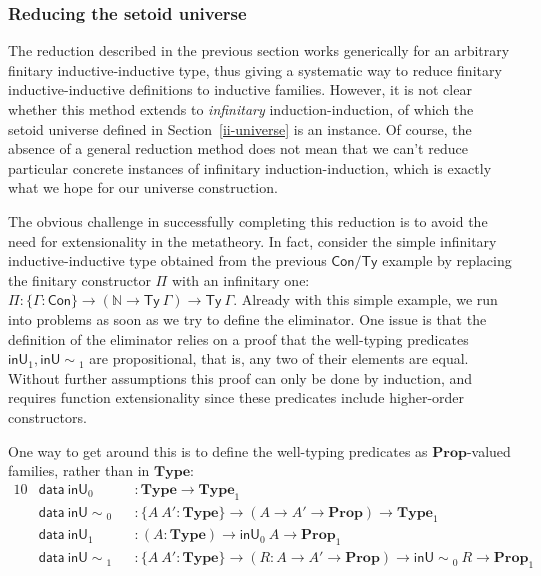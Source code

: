 \documentclass[autoref]{llncs}
\newcommand{\GG}{\Gamma}
\newcommand{\inU}{\mathsf{inU}}
\newcommand{\inUU}{\mathsf{inU{\sim}}}
\newcommand{\mType}{\mathbf{Type}}
\newcommand{\mProp}{\mathbf{Prop}}
\begin{document}
\subsubsection{Reducing the setoid universe}\label{inductive-universe}

The reduction described in the previous section works generically for an
arbitrary finitary inductive-inductive type, thus giving a systematic way to
reduce finitary inductive-inductive definitions to inductive families. However,
it is not clear whether this method extends to \emph{infinitary}
induction-induction, of which the setoid universe defined in
Section~\ref{ii-universe} is an instance.
%
Of course, the absence of a general reduction method does not mean that we can't
reduce particular concrete instances of infinitary induction-induction, which is
exactly what we hope for our universe construction.

The obvious challenge in successfully completing this reduction is to avoid the
need for extensionality in the metatheory. In fact, consider the simple
infinitary inductive-inductive type obtained from the previous $\textsf{Con/Ty}$
example by replacing the finitary constructor $\Pi$ with an infinitary one: $\Pi
: \{\GG : \textsf{Con}\} \to (\mathds{N} \to \textsf{Ty}\ \GG) \to
\textsf{Ty}\ \GG$. Already with this simple example, we run into problems as
soon as we try to define the eliminator. One issue is that the definition of the
eliminator relies on a proof that the well-typing predicates $\inU_1,
\inUU_1$ are propositional, that is, any two of their elements are equal.
%
Without further assumptions this proof can only be done by induction, and
requires function extensionality since these predicates include higher-order
constructors.

One way to get around this is to define the well-typing predicates as
$\mProp$-valued families, rather than in $\mType$:
\vspace{-0.2em}
\begin{alignat*}{10}
  & \textsf{data}\ \inU_0 && : \mType \to \mType_1 \\
  & \textsf{data}\ \inUU_0 && : \{A\ A' : \mType\} \to (A \to A' \to \mProp) \to \mType_1 \\
  & \textsf{data}\ \inU_1 && : (A : \mType) \to \inU_0\ A \to \mProp_1 \\
  & \textsf{data}\ \inUU_1 && : \{A\ A' : \mType\} \to (R : A \to A' \to \mProp) \to \inUU_0\ R \to \mProp_1
\end{alignat*}
\end{document}
